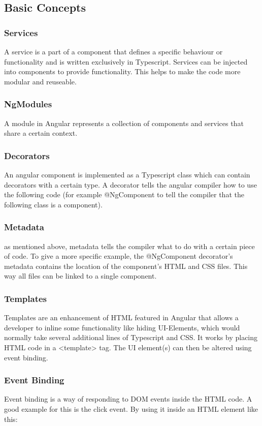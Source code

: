 \subsection {Basic Concepts}

\subsubsection {Services}
A service is a part of a component that defines a specific behaviour or functionality and is written exclusively in Typescript. Services can be injected into components to provide functionality. This helps to make the code more modular and reuseable.

\subsubsection{NgModules}
A module in Angular represents a collection of components and services that share a certain context.

\subsubsection{Decorators}
An angular component is implemented as a Typescript class which can contain decorators with a certain type. A decorator tells the angular compiler how to use the following code (for example @NgComponent to tell the compiler that the following class is a component).

\subsubsection{Metadata}
as mentioned above, metadata tells the compiler what to do with a certain piece of code. To give a more specific example, the @NgComponent decorator’s metadata contains the location of the component’s HTML and CSS files. This way all files can be linked to a single component.

\subsubsection{Templates}
Templates are an enhancement of HTML featured in Angular that allows a developer to inline some functionality like hiding UI-Elements, which would normally take several additional lines of Typescript and CSS. It works by placing HTML code in a <template> tag. The UI element(s) can then be altered using event binding.

\subsubsection{Event Binding}
Event binding is a way of responding to DOM events inside the HTML code. A good example for this is the click event. By using it inside an HTML element like this:

